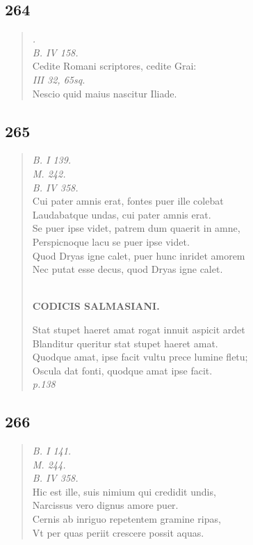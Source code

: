 \documentclass[11pt, a4paper]{report}
\begin{document}
            \subsection*{264}
      \begin{verse}
      \textit{.} \\ \textit{B. IV 158.} \\ Cedite Romani scriptores, cedite Grai: \\ \textit{III 32, 65sq.} \\ Nescio quid maius nascitur Iliade. \\ 
      \end{verse}
  
            \subsection*{265}
      \begin{verse}
      \textit{B. I 139.} \\ \textit{M. 242.} \\ \textit{B. IV 358.} \\ Cui pater amnis erat, fontes puer ille colebat \\ Laudabatque undas, cui pater amnis erat. \\ Se puer ipse videt, patrem dum quaerit in amne, \\ Perspicnoque lacu se puer ipse videt. \\ Quod Dryas igne calet, puer hunc inridet amorem \\ Nec putat esse decus, quod Dryas igne calet. \\ 
        ﻿\pagebreak 
    \begin{center} \textbf{CODICIS SALMASIANI.} \end{center} \marginpar{[01]} Stat stupet haeret amat rogat innuit aspicit ardet \\ Blanditur queritur stat stupet haeret amat. \\ Quodque amat, ipse facit vultu prece lumine fletu; \\ Oscula dat fonti, quodque amat ipse facit. \\ \textit{p.138} \\ 
      \end{verse}
  
            \subsection*{266}
      \begin{verse}
      \textit{B. I 141.} \\ \textit{M. 244.} \\ \textit{B. IV 358.} \\ Hic est ille, suis nimium qui credidit undis, \\ Narcissus vero dignus amore puer. \\ Cernis ab inriguo repetentem gramine ripas, \\ Vt per quas periit crescere possit aquas. \\ 
      \end{verse}
  
\end{document}
